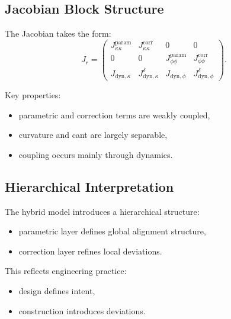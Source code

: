 \subsection{Jacobian Block Structure}

\begin{definition}
The Jacobian takes the form:
\[
J_r =
\begin{pmatrix}
J_{\kappa\kappa}^{\mathrm{param}} & J_{\kappa\kappa}^{\mathrm{corr}} & 0 & 0 \\
0 & 0 & J_{\phi\phi}^{\mathrm{param}} & J_{\phi\phi}^{\mathrm{corr}} \\
J_{\mathrm{dyn},\kappa} & J_{\mathrm{dyn},\kappa}^{\delta} &
J_{\mathrm{dyn},\phi} & J_{\mathrm{dyn},\phi}^{\delta}
\end{pmatrix}.
\]
\end{definition}

Key properties:
\begin{itemize}
\item parametric and correction terms are weakly coupled,
\item curvature and cant are largely separable,
\item coupling occurs mainly through dynamics.
\end{itemize}

\subsection{Hierarchical Interpretation}

The hybrid model introduces a hierarchical structure:
\begin{itemize}
\item parametric layer defines global alignment structure,
\item correction layer refines local deviations.
\end{itemize}

This reflects engineering practice:
\begin{itemize}
\item design defines intent,
\item construction introduces deviations.
\end{itemize}

